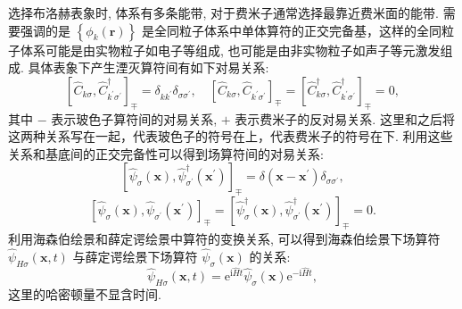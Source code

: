 选择布洛赫表象时, 体系有多条能带, 对于费米子通常选择最靠近费米面的能带. 需要强调的是 $\left\{\phi_{k}(\boldsymbol{r})\right\}$ 是全同粒子体系中单体算符的正交完备基，这样的全同粒子体系可能是由实物粒子如电子等组成, 也可能是由非实物粒子如声子等元激发组成. 具体表象下产生湮灭算符间有如下对易关系:
\begin{equation}
\left[\hat{C}^{}_{k \sigma}, \hat{C}_{k^{\prime} \sigma^{\prime}}^{\dagger}\right]_{\mp}=\delta_{k k^{\prime}} \delta_{\sigma \sigma^{\prime}}, \quad\left[\hat{C}_{k \sigma}, \hat{C}_{k^{\prime} \sigma^{\prime}}\right]_{\mp}=\left[\hat{C}_{k \sigma}^{\dagger}, \hat{C}_{k^{\prime} \sigma^{\prime}}^{\dagger}\right]_{\mp}=0,
\end{equation}
其中 $-$ 表示玻色子算符间的对易关系, $+$ 表示费米子的反对易关系. 这里和之后将这两种关系写在一起，代表玻色子的符号在上，代表费米子的符号在下. 利用这些关系和基底间的正交完备性可以得到场算符间的对易关系:
\begin{equation}
\left[\hat{\psi}^{}_{\sigma}(\boldsymbol{x}), \hat{\psi}_{\sigma^{\prime}}^{\dagger}\left(\boldsymbol{x}^{\prime}\right)\right]_{\mp}=\delta\left(\boldsymbol{x}-\boldsymbol{x}^{\prime}\right) \delta_{\sigma \sigma^{\prime}}, 
\end{equation}
\begin{equation}
\left[\hat{\psi}_{\sigma}(\boldsymbol{x}), \hat{\psi}_{\sigma^{\prime}}\left(\boldsymbol{x}^{\prime}\right)\right]_{\mp}=\left[\hat{\psi}_{\sigma}^{\dagger}(\boldsymbol{x}), \hat{\psi}_{\sigma^{\prime}}^{\dagger}\left(\boldsymbol{x}^{\prime}\right)\right]_{\mp}=0 .
\end{equation}
利用海森伯绘景和薛定谔绘景中算符的变换关系, 可以得到海森伯绘景下场算符 $\hat{\psi}_{H \sigma}(\boldsymbol{x}, t)$ 与薛定谔绘景下场算符 $\hat{\psi}_{\sigma}(\boldsymbol{x})$ 的关系:
\begin{equation}
\hat{\psi}_{H \sigma}(\boldsymbol{x}, t)=\mathrm{e}^{\mathrm{i} \hat{H} t} \hat{\psi}_{\sigma}(\boldsymbol{x}) \mathrm{e}^{-\mathrm{i} \hat{H} t},
\end{equation}
这里的哈密顿量不显含时间.

